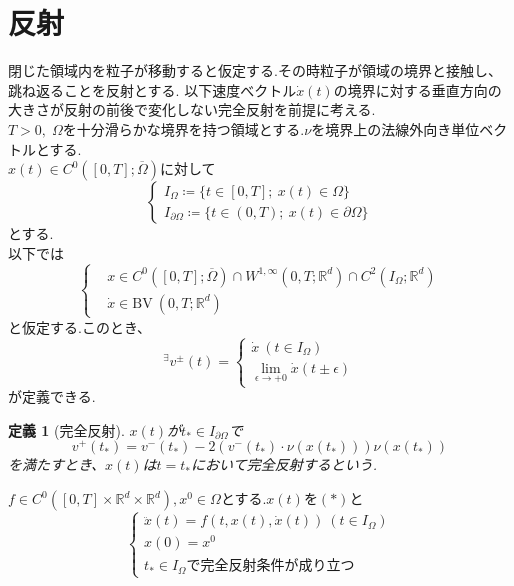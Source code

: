 \documentclass[a4,12pt]{article}
\newtheorem{dfn}{定義}
\begin{document}
\section{反射}
閉じた領域内を粒子が移動すると仮定する.その時粒子が領域の境界と接触し、跳ね返ることを反射とする.
以下速度べクトル$\dot{x}(t)$の境界に対する垂直方向の大きさが反射の前後で変化しない完全反射を前提に考える.\\
$T>0,\;\Omega$を十分滑らかな境界を持つ領域とする.$\nu$を境界上の法線外向き単位ベクトルとする.\\

$x(t)\in C^{0}([0,T];\overline{\Omega})$に対して
\[\begin{cases}
I_{\Omega}\coloneqq \{t\in[0,T];\ x(t)\in\Omega\}\\
I_{\partial\Omega}\coloneqq \{t\in(0,T);\ x(t)\in\partial\Omega\}
\end{cases}\]
とする.\\
以下では
\begin{equation}\left\{\begin{aligned}
&x \in C^0([0,T];\overline{\Omega})\cap W^{1,\infty}(0,T;\mathbb{R}^d) \cap C^2(I_\Omega ;\mathbb{R}^d) \\
&\dot{x} \in \text{BV}\ (0,T;\mathbb{R}^d)
\end{aligned}\right.\end{equation}
と仮定する.このとき、
\[{}^{\exists} v^{\pm}(t)=\begin{cases}
\dot{x} \ (t\in{I_\Omega}) \\
\displaystyle\lim_{\epsilon\to +0}\dot{x}(t\pm\epsilon)
\end{cases}\]
が定義できる.
\begin{dfn}[完全反射]
\label{reflect}
$x(t)$が$t_{\ast}\in I_{\partial\Omega}$で\\
\begin{equation}v^+ (t_\ast)=v^{-}(t_\ast)-2(v^{-}(t_\ast)\cdot\nu (x(t_\ast)))\nu (x(t_\ast))\end{equation}
を満たすとき、$x(t)$は$t=t_{\ast}$において完全反射するという.
\end{dfn}
$f \in C^{0} ([0,T] \times \mathbb{R}^d \times \mathbb{R}^d ),x^0\in\Omega$とする.$x(t)$を$(\ast)$と
\begin{equation}
\begin{cases}
\ddot{x}(t)=f(t,x(t),\dot{x}(t))\ (t\in I_{\Omega})\\
x(0)=x^0\\
t_\ast\in I_{\Omega}\text{で完全反射条件が成り立つ}
\end{cases}
\end{equation}
\end{document}

